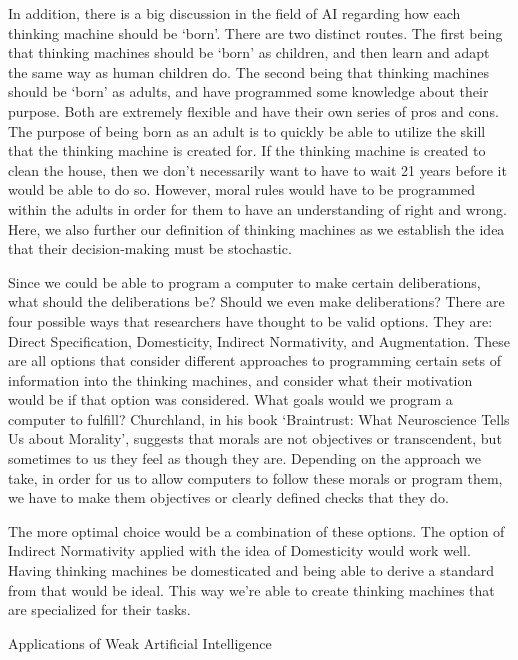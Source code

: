 \documentclass[11pt]{article}
\begin{document}
\par In addition, there is a big discussion in the field of AI regarding how each thinking machine should be `born'. There are two distinct routes. The first being that thinking machines should be `born' as children, and then learn and adapt the same way as human children do. The second being that thinking machines should be `born' as adults, and have programmed some knowledge about their purpose. Both are extremely flexible and have their own series of pros and cons. The purpose of being born as an adult is to quickly be able to utilize the skill that the thinking machine is created for. If the thinking machine is created to clean the house, then we don't necessarily want to have to wait 21 years before it would be able to do so. However, moral rules would have to be programmed within the adults in order for them to have an understanding of right and wrong. Here, we also further our definition of thinking machines as we establish the idea that their decision-making must be stochastic.

\par Since we could be able to program a computer to make certain deliberations, what should the deliberations be? Should we even make deliberations? There are four possible ways that researchers have thought to be valid options. They are: Direct Specification, Domesticity, Indirect Normativity, and Augmentation. These are all options that consider different approaches to programming certain sets of information into the thinking machines, and consider what their motivation would be if that option was considered. What goals would we program a computer to fulfill? Churchland, in his book `Braintrust: What Neuroscience Tells Us about Morality', suggests that morals are not objectives or transcendent, but sometimes to us they feel as though they are. Depending on the approach we take, in order for us to allow computers to follow these morals or program them, we have to make them objectives or clearly defined checks that they do.

\par The more optimal choice would be a combination of these options. The option of Indirect Normativity applied with the idea of Domesticity would work well. Having thinking machines be domesticated and being able to derive a standard from that would be ideal. This way we're able to create thinking machines that are specialized for their tasks.

\begin{center}
	{\large Applications of Weak Artificial Intelligence\par}
\end{center}
\end{document}
